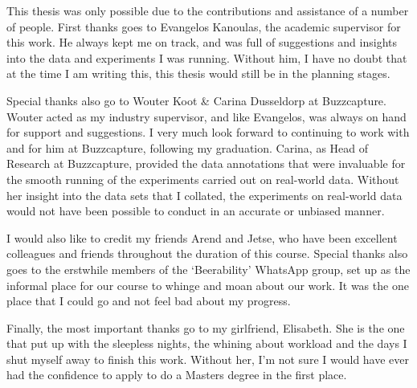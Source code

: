 \documentclass[../main.tex]{subfiles}
\begin{document}
This thesis was only possible due to the contributions and assistance of a number of people. First thanks goes to Evangelos Kanoulas, the academic supervisor for this work. He always kept me on track, and was full of suggestions and insights into the data and experiments I was running. Without him, I have no doubt that at the time I am writing this, this thesis would still be in the planning stages.

Special thanks also go to Wouter Koot \& Carina Dusseldorp at Buzzcapture. Wouter acted as my industry supervisor, and like Evangelos, was always on hand for support and suggestions. I very much look forward to continuing to work with and for him at Buzzcapture, following my graduation. Carina, as Head of Research at Buzzcapture, provided the data annotations that were invaluable for the smooth running of the experiments carried out on real-world data. Without her insight into the data sets that I collated, the experiments on real-world data would not have been possible to conduct in an accurate or unbiased manner.

I would also like to credit my friends Arend and Jetse, who have been excellent colleagues and friends throughout the duration of this course. Special thanks also goes to the erstwhile members of the `Beerability' WhatsApp group, set up as the informal place for our course to whinge and moan about our work. It was the one place that I could go and not feel bad about my progress.

Finally, the most important thanks go to my girlfriend, Elisabeth. She is the one that put up with the sleepless nights, the whining about workload and the days I shut myself away to finish this work. Without her, I'm not sure I would have ever had the confidence to apply to do a Masters degree in the first place.
\end{document}

